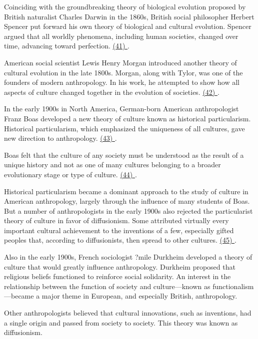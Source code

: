 \qquad Coinciding with the groundbreaking theory of biological evolution proposed by British naturalist Charles Darwin in the 1860s, British social philosopher Herbert Spencer put forward his own theory of biological and cultural evolution. Spencer argued that all worldly phenomena, including human societies, changed over time, advancing toward perfection. \ul{(41) \qquad\qquad\qquad\qquad}.

\qquad American social scientist Lewis Henry Morgan introduced another theory of cultural evolution in the late 1800s. Morgan, along with Tylor, was one of the founders of modern anthropology. In his work, he attempted to show how all aspects of culture changed together in the evolution of societies. \ul{(42) \qquad\qquad}.

\qquad In the early 1900s in North America, German-born American anthropologist Franz Boas developed a new theory of culture known as historical particularism. Historical particularism, which emphasized the uniqueness of all cultures, gave new direction to anthropology. \ul{(43) \qquad\qquad\qquad\qquad}.

\qquad Boas felt that the culture of any society must be understood as the result of a unique history and not as one of many cultures belonging to a broader evolutionary stage or type of culture. \ul{(44) \qquad\qquad\qquad\qquad}.

\qquad Historical particularism became a dominant approach to the study of culture in American anthropology, largely through the influence of many students of Boas. But a number of anthropologists in the early 1900s also rejected the particularist theory of culture in favor of diffusionism. Some attributed virtually every important cultural achievement to the inventions of a few, especially gifted peoples that, according to diffusionists, then spread to other cultures. \ul{(45) \quad\quad\quad\quad}.

\qquad Also in the early 1900s, French sociologist ?mile Durkheim developed a theory of culture that would greatly influence anthropology. Durkheim proposed that religious beliefs functioned to reinforce social solidarity. An interest in the relationship between the function of society and culture—known as functionalism—became a major theme in European, and especially British, anthropology.

\qquad [A] Other anthropologists believed that cultural innovations, such as inventions, had a single origin and passed from society to society. This theory was known as diffusionism.


